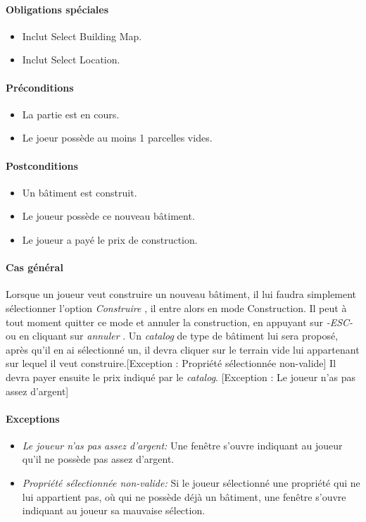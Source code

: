 \documentclass[a4paper,11pt]{report}
\begin{document}
\paragraph{Obligations spéciales}
\begin{itemize}
 \item Inclut Select Building Map.
 \item Inclut Select Location.
\end{itemize}
\paragraph{Préconditions}
\begin{itemize}
 \item La partie est en cours.
 \item Le joeur possède au moins 1 parcelles vides.
\end{itemize}
\newpage
\paragraph{Postconditions}
\begin{itemize}
 \item Un bâtiment est construit.
 \item Le joueur possède ce nouveau bâtiment.
 \item Le joueur a payé le prix de construction.
\end{itemize}
\paragraph{Cas général}
Lorsque un joueur veut construire un nouveau bâtiment, il lui faudra simplement sélectionner l'option \og \textit{Construire} \fg, il entre alors en mode Construction. Il peut à tout moment quitter ce mode et annuler la construction, en appuyant sur \og \textit{-ESC-} \fg ou en cliquant sur \og \textit{annuler} \fg. Un \textit{catalog} de type de bâtiment lui sera proposé, après qu'il en ai sélectionné un, il devra cliquer sur le terrain vide lui appartenant sur lequel il veut construire.[Exception : Propriété sélectionnée non-valide] Il devra payer ensuite le prix indiqué par le \textit{catalog}. [Exception : Le joueur n'as pas assez d'argent]
\paragraph{Exceptions}
\begin{itemize}
 \item \textit{Le joueur n'as pas assez d'argent:}  Une fenêtre s'ouvre indiquant au joueur qu'il ne possède pas assez d'argent.
 \item \textit{Propriété sélectionnée non-valide:}  Si le joueur sélectionné une propriété qui ne lui appartient pas, où qui ne possède déjà un bâtiment, une fenêtre s'ouvre indiquant au joueur sa mauvaise sélection.
\end{itemize}
\end{document}
